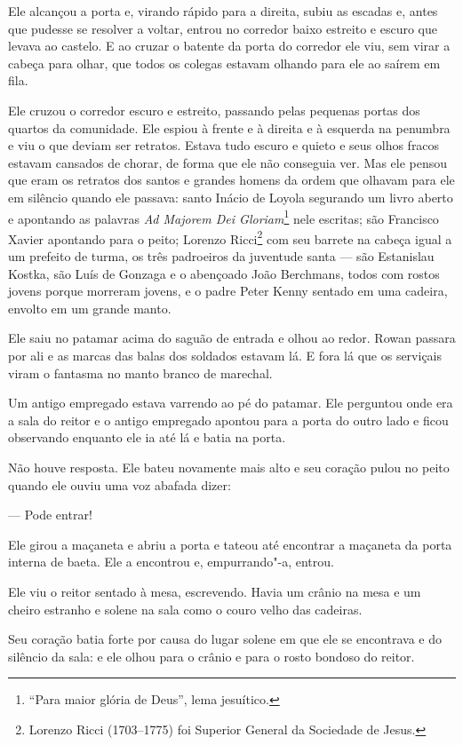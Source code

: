 Ele alcançou a porta e, virando rápido para a direita, subiu as escadas e,
antes que pudesse se resolver a voltar, entrou no corredor baixo
estreito e escuro que levava ao castelo. E ao cruzar o batente da porta
do corredor ele viu, sem virar a cabeça para olhar, que todos os
colegas estavam olhando para ele ao saírem em fila.

Ele cruzou o corredor escuro e estreito, passando pelas pequenas portas
dos quartos da comunidade. Ele espiou à frente e à direita e à esquerda
na penumbra e viu o que deviam ser retratos. Estava tudo escuro e
quieto e seus olhos fracos estavam cansados de chorar, de forma que ele
não conseguia ver. Mas ele pensou que eram os retratos dos santos e
grandes homens da ordem que olhavam para ele em silêncio quando ele
passava: santo Inácio de Loyola segurando um livro aberto e apontando
as palavras \textit{Ad Majorem Dei Gloriam}\footnote{ “Para maior glória de Deus”, lema jesuítico.} nele escritas; são
Francisco Xavier apontando para o peito; Lorenzo Ricci\footnote{ Lorenzo Ricci (1703--1775) foi Superior General da Sociedade de Jesus.} com seu barrete
na cabeça igual a um prefeito de turma, os três padroeiros da juventude
santa --- são Estanislau Kostka, são Luís de Gonzaga e o abençoado João
Berchmans, todos com rostos jovens porque morreram jovens, e o padre
Peter Kenny sentado em uma cadeira, envolto em um grande manto.

Ele saiu no patamar acima do saguão de entrada e olhou ao redor. Rowan
passara por ali e as marcas das balas dos soldados estavam lá. E fora
lá que os serviçais viram o fantasma no manto branco de marechal.

Um antigo empregado estava varrendo ao pé do patamar. Ele perguntou onde
era a sala do reitor e o antigo empregado apontou para a porta do outro
lado e ficou observando enquanto ele ia até lá e batia na porta.

Não houve resposta. Ele bateu novamente mais alto e seu coração pulou no
peito quando ele ouviu uma voz abafada dizer:

 --- Pode entrar!

Ele girou a maçaneta e abriu a porta e tateou até encontrar a maçaneta
da porta interna de baeta. Ele a encontrou e, empurrando"-a, entrou.

Ele viu o reitor sentado à mesa, escrevendo. Havia um crânio na mesa e
um cheiro estranho e solene na sala como o couro velho das cadeiras.

Seu coração batia forte por causa do lugar solene em que ele se
encontrava e do silêncio da sala: e ele olhou para o crânio e para o
rosto bondoso do reitor.

